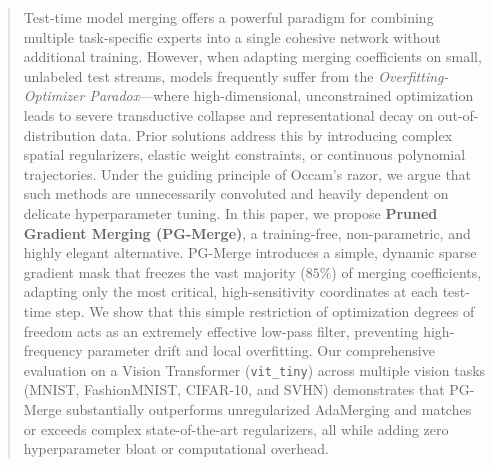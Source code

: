 \begin{abstract}
Test-time model merging offers a powerful paradigm for combining multiple task-specific experts into a single cohesive network without additional training. However, when adapting merging coefficients on small, unlabeled test streams, models frequently suffer from the \emph{Overfitting-Optimizer Paradox}---where high-dimensional, unconstrained optimization leads to severe transductive collapse and representational decay on out-of-distribution data. Prior solutions address this by introducing complex spatial regularizers, elastic weight constraints, or continuous polynomial trajectories. Under the guiding principle of Occam's razor, we argue that such methods are unnecessarily convoluted and heavily dependent on delicate hyperparameter tuning. In this paper, we propose \textbf{Pruned Gradient Merging (PG-Merge)}, a training-free, non-parametric, and highly elegant alternative. PG-Merge introduces a simple, dynamic sparse gradient mask that freezes the vast majority ($85\%$) of merging coefficients, adapting only the most critical, high-sensitivity coordinates at each test-time step. We show that this simple restriction of optimization degrees of freedom acts as an extremely effective low-pass filter, preventing high-frequency parameter drift and local overfitting. Our comprehensive evaluation on a Vision Transformer (\texttt{vit\_tiny}) across multiple vision tasks (MNIST, FashionMNIST, CIFAR-10, and SVHN) demonstrates that PG-Merge substantially outperforms unregularized AdaMerging and matches or exceeds complex state-of-the-art regularizers, all while adding zero hyperparameter bloat or computational overhead.
\end{abstract}
